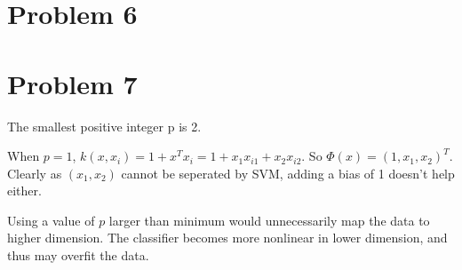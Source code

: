 \documentclass[10pt]{article}
\begin{document}
\section*{Problem 6}

\section*{Problem 7}

The smallest positive integer p is 2.

When $p = 1$, $k(x, x_i) = 1 + x^T x_i = 1 + x_1 x_{i1} + x_2 x_{i2}$.
So $\Phi(x) = (1, x_1, x_2)^T$. Clearly as $(x_1, x_2)$ cannot be
seperated by SVM, adding a bias of 1 doesn't help either.

Using a value of $p$ larger than minimum would unnecessarily map the
data to higher dimension. The classifier becomes more nonlinear in
lower dimension, and thus may overfit the data.
\end{document}
